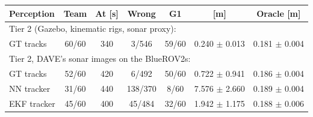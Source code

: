 \begin{tabular}{lcccccc}
\toprule
Perception & Team & At [s] & Wrong & G1 & \avatar{} [m] & Oracle [m] \\
\midrule
\multicolumn{7}{l}{Tier 2 (Gazebo, kinematic rigs, sonar proxy):} \\
\quad GT tracks & 60/60 & 340 & 3/546 & 59/60 & 0.240 $\pm$ 0.013 & 0.181 $\pm$ 0.004 \\
\multicolumn{7}{l}{Tier 2, DAVE's sonar images on the BlueROV2s:} \\
\quad GT tracks & 52/60 & 420 & 6/492 & 50/60 & 0.722 $\pm$ 0.941 & 0.186 $\pm$ 0.004 \\
\quad NN tracker & 31/60 & 440 & 138/370 & 8/60 & 7.576 $\pm$ 2.660 & 0.189 $\pm$ 0.004 \\
\quad EKF tracker & 45/60 & 400 & 45/484 & 32/60 & 1.942 $\pm$ 1.175 & 0.188 $\pm$ 0.006 \\
\bottomrule
\end{tabular}
